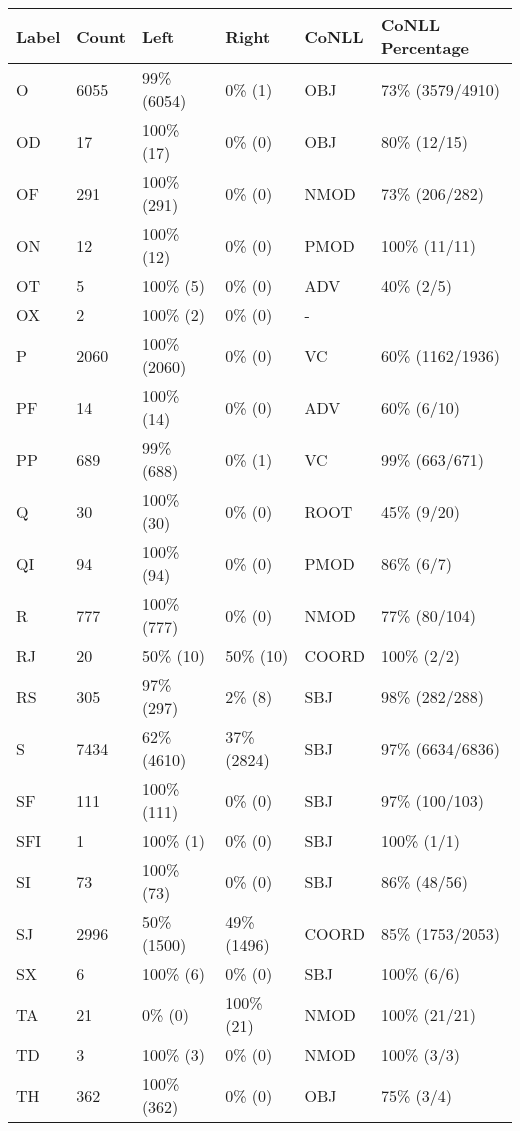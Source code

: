 \begin{figure*}
\begin{tabular}{|l|l|l|l||l|l|}
\hline
Label & Count & Left & Right & CoNLL & CoNLL Percentage\\ 
\hline
 O & 6055 & 99\% (6054) & 0\% (1) & OBJ & 73\% (3579/4910) \\ 
\hline
 OD & 17 & 100\% (17) & 0\% (0) & OBJ & 80\% (12/15) \\ 
\hline
 OF & 291 & 100\% (291) & 0\% (0) & NMOD & 73\% (206/282) \\ 
\hline
 ON & 12 & 100\% (12) & 0\% (0) & PMOD & 100\% (11/11) \\ 
\hline
 OT & 5 & 100\% (5) & 0\% (0) & ADV & 40\% (2/5) \\ 
\hline
 OX & 2 & 100\% (2) & 0\% (0) & - &  \\ 
\hline
 P & 2060 & 100\% (2060) & 0\% (0) & VC & 60\% (1162/1936) \\ 
\hline
 PF & 14 & 100\% (14) & 0\% (0) & ADV & 60\% (6/10) \\ 
\hline
 PP & 689 & 99\% (688) & 0\% (1) & VC & 99\% (663/671) \\ 
\hline
 Q & 30 & 100\% (30) & 0\% (0) & ROOT & 45\% (9/20) \\ 
\hline
 QI & 94 & 100\% (94) & 0\% (0) & PMOD & 86\% (6/7) \\ 
\hline
 R & 777 & 100\% (777) & 0\% (0) & NMOD & 77\% (80/104) \\ 
\hline
 RJ & 20 & 50\% (10) & 50\% (10) & COORD & 100\% (2/2) \\ 
\hline
 RS & 305 & 97\% (297) & 2\% (8) & SBJ & 98\% (282/288) \\ 
\hline
 S & 7434 & 62\% (4610) & 37\% (2824) & SBJ & 97\% (6634/6836) \\ 
\hline
 SF & 111 & 100\% (111) & 0\% (0) & SBJ & 97\% (100/103) \\ 
\hline
 SFI & 1 & 100\% (1) & 0\% (0) & SBJ & 100\% (1/1) \\ 
\hline
 SI & 73 & 100\% (73) & 0\% (0) & SBJ & 86\% (48/56) \\ 
\hline
 SJ & 2996 & 50\% (1500) & 49\% (1496) & COORD & 85\% (1753/2053) \\ 
\hline
 SX & 6 & 100\% (6) & 0\% (0) & SBJ & 100\% (6/6) \\ 
\hline
 TA & 21 & 0\% (0) & 100\% (21) & NMOD & 100\% (21/21) \\ 
\hline
 TD & 3 & 100\% (3) & 0\% (0) & NMOD & 100\% (3/3) \\ 
\hline
 TH & 362 & 100\% (362) & 0\% (0) & OBJ & 75\% (3/4) \\ 

\end{tabular}
\end{figure*}
